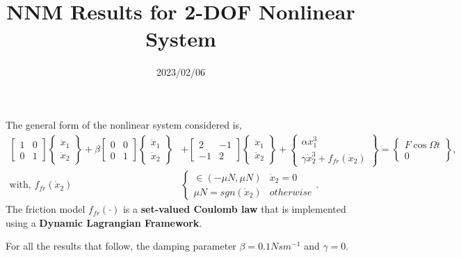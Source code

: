 \documentclass[12pt]{article}
\title{NNM Results for 2-DOF Nonlinear System}
\date{2023/02/06}
\begin{document}
\maketitle{}

\tableofcontents{}

The general form of the nonlinear system considered is,
\begin{align}
  \begin{bmatrix} 1 & 0\\ 0 & 1 \end{bmatrix}
  \begin{Bmatrix} \ddot{x}_1\\ \ddot{x}_2 \end{Bmatrix} +
  \beta \begin{bmatrix} 0 & 0\\ 0 & 1 \end{bmatrix}
  \begin{Bmatrix} \dot{x}_1\\ \dot{x}_2 \end{Bmatrix} &+
  \begin{bmatrix} 2 & -1\\ -1 & 2 \end{bmatrix}
  \begin{Bmatrix} \ddot{x}_1\\ \ddot{x}_2 \end{Bmatrix} +
  \begin{Bmatrix}
    \alpha x_1^3\\ \gamma \dot{x}_2^3 + f_{fr}(\dot{x}_2)
  \end{Bmatrix} =
  \begin{Bmatrix}
    F \cos\Omega t\\ 0
  \end{Bmatrix}, \label{eq:nleqgform}\\
  \text{with, } f_{fr}(\dot{x}_2) & \begin{cases} \in (-\mu N, \mu N)
                                      & \dot{x}_2=0\\ \mu N
                                      =sgn(\dot{x}_2) &
                                                       otherwise \end{cases}. 
\end{align}
The friction model $f_{fr}(\cdot)$ is a \textbf{set-valued Coulomb
  law} that is implemented using a \textbf{Dynamic Lagrangian
  Framework}.

For all the results that follow, the damping parameter $\beta=0.1 N s
m^{-1}$ and $\gamma=0$. 
\end{document}
